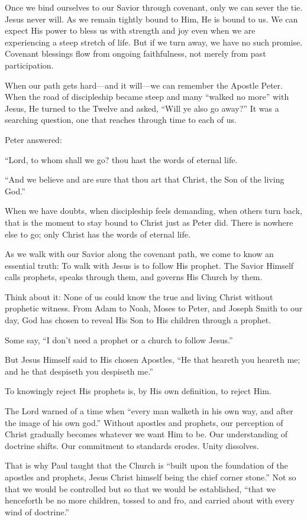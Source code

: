 \documentclass[letterpaper, 11pt]{report}
\begin{document}
Once we bind ourselves to our Savior through covenant, only we can sever the tie. Jesus never will. As we remain tightly bound to Him, He is bound to us. We can expect His power to bless us with strength and joy even when we are experiencing a steep stretch of life. But if we turn away, we have no such promise. Covenant blessings flow from ongoing faithfulness, not merely from past participation.

When our path gets hard—and it will—we can remember the Apostle Peter. When the road of discipleship became steep and many “walked no more” with Jesus, He turned to the Twelve and asked, “Will ye also go away?” It was a searching question, one that reaches through time to each of us.

Peter answered:

“Lord, to whom shall we go? thou hast the words of eternal life.

“And we believe and are sure that thou art that Christ, the Son of the living God.”

When we have doubts, when discipleship feels demanding, when others turn back, that is the moment to stay bound to Christ just as Peter did. There is nowhere else to go; only Christ has the words of eternal life.

As we walk with our Savior along the covenant path, we come to know an essential truth: To walk with Jesus is to follow His prophet. The Savior Himself calls prophets, speaks through them, and governs His Church by them.

Think about it: None of us could know the true and living Christ without prophetic witness. From Adam to Noah, Moses to Peter, and Joseph Smith to our day, God has chosen to reveal His Son to His children through a prophet.

Some say, “I don’t need a prophet or a church to follow Jesus.”

But Jesus Himself said to His chosen Apostles, “He that heareth you heareth me; and he that despiseth you despiseth me.”

To knowingly reject His prophets is, by His own definition, to reject Him.

The Lord warned of a time when “every man walketh in his own way, and after the image of his own god.” Without apostles and prophets, our perception of Christ gradually becomes whatever we want Him to be. Our understanding of doctrine shifts. Our commitment to standards erodes. Unity dissolves.

That is why Paul taught that the Church is “built upon the foundation of the apostles and prophets, Jesus Christ himself being the chief corner stone.” Not so that we would be controlled but so that we would be established, “that we henceforth be no more children, tossed to and fro, and carried about with every wind of doctrine.”
\end{document}
